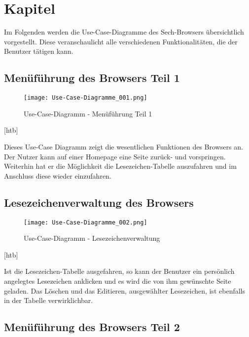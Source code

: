 
\chapter{Kapitel}

Im Folgenden werden die Use-Case-Diagramme des Sech-Browsers übersichtlich vorgestellt. Diese veranschaulicht alle verschiedenen Funktionalitäten, die der Benutzer tätigen kann.

\section{Menüführung des Browsers Teil 1}

\begin{figure}[htb]
\texttt{[image: Use-Case-Diagramme\_001.png]}
	\caption{Use-Case-Diagramm - Menüführung Teil 1}
	\label{fig:Menüführung Teil 1}
\end{figure}[htb]
	
Dieses Use-Case Diagramm zeigt die wesentlichen Funktionen des Browsers an. Der Nutzer kann auf einer Homepage eine Seite zurück- und vorspringen. Weiterhin hat er die Möglichkeit die Lesezeichen-Tabelle auszufahren und im Anschluss diese wieder einzufahren.

\section{Lesezeichenverwaltung des Browsers}

\begin{figure}[htb]
\texttt{[image: Use-Case-Diagramme\_002.png]}
	\caption{Use-Case-Diagramm - Lesezeichenverwaltung}
	\label{fig:Lesezeichenverwaltung}
\end{figure}[htb]

Ist die Lesezeichen-Tabelle ausgefahren, so kann der Benutzer ein persönlich angelegtes Lesezeichen anklicken und es wird die von ihm gewünschte Seite geladen. Das Löschen und das Editieren, ausgewählter Lesezeichen, ist ebenfalls in der Tabelle verwirklichbar.

\section{Menüführung des Browsers Teil 2}

